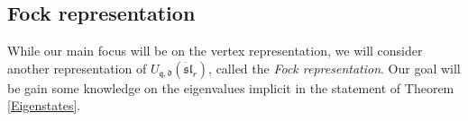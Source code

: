 \documentclass{amsart}
\newcommand{\qqq}{\mathfrak{q}}
\newcommand{\ddd}{\mathfrak{d}}
\theoremstyle{remark}
\numberwithin{thm}{section}
\numberwithin{equation}{section}
\begin{document}
%
%
\subsection{Fock representation}
While our main focus will be on the vertex representation, we will consider another representation of $U_{\qqq,\ddd}(\ddot{\mathfrak{sl}}_r)$, called the \textit{Fock representation}.
Our goal will be gain some knowledge on the eigenvalues implicit in the statement of Theorem \ref{Eigenstates}.
\end{document}
